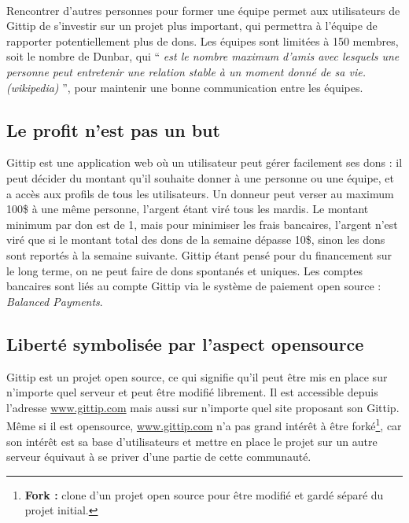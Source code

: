 \paragraph{}
Rencontrer d'autres personnes pour former une équipe permet aux utilisateurs de
Gittip de s'investir sur un projet plus important, qui permettra à l'équipe de
rapporter potentiellement plus de dons. Les équipes sont limitées à 150
membres, soit le nombre de Dunbar, qui `` \emph{est le nombre maximum
d'amis avec lesquels une personne peut entretenir une relation stable à un
moment donné de sa vie. (wikipedia)} '', pour maintenir une bonne communication
entre les équipes.

    \subsection{Le profit n'est pas un but}

Gittip est une application web où un utilisateur peut gérer facilement ses dons
: il peut décider du montant qu'il souhaite donner à une personne ou une
équipe, et a accès aux profils de tous les utilisateurs. Un donneur peut verser
au maximum 100\${} à une même personne, l'argent étant viré tous les mardis. Le
montant minimum par don est de 1\textcent, mais pour minimiser les frais
bancaires, l'argent n'est viré que si le montant total des dons de la semaine
dépasse 10\${}, sinon les dons sont reportés à la semaine suivante.  Gittip
étant pensé pour du financement sur le long terme, on ne peut faire de dons
spontanés et uniques. Les comptes bancaires sont liés au compte Gittip via le
système de paiement open source : \emph{Balanced Payments}.

    \subsection{Liberté symbolisée par l'aspect opensource}

Gittip est un projet open source, ce qui signifie qu'il peut être mis en place
sur n'importe quel serveur et peut être modifié librement.  Il est accessible
depuis l'adresse \url{www.gittip.com} mais aussi sur n'importe quel site
proposant son Gittip. Même si il est opensource, \url{www.gittip.com} n'a pas
grand intérêt à être forké\footnote{\textbf{Fork :} clone d'un projet open
source pour être modifié et gardé séparé du projet initial.}, car son intérêt
est sa base d'utilisateurs et mettre en place le projet sur un autre serveur
équivaut à se priver d'une partie de cette communauté.

